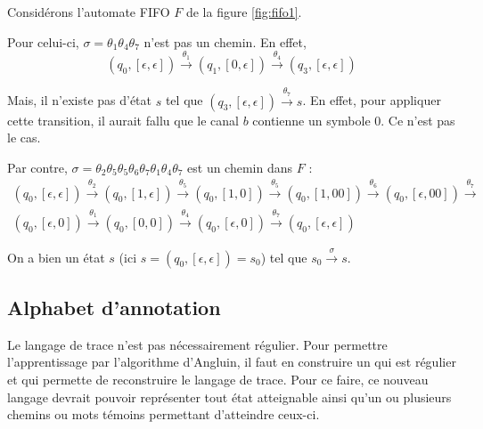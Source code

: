 \begin{example}
  Considérons l'automate FIFO $F$ de la figure \ref{fig:fifo1}.

  Pour celui-ci, $\sigma=\theta_1\theta_4\theta_7$ n'est pas un chemin. En effet,
  $$
  (q_0,[\epsilon,\epsilon])\xrightarrow{\theta_1}(q_1,[0,\epsilon])\xrightarrow{\theta_4}(q_3,[\epsilon,\epsilon])
  $$

  Mais, il n'existe pas d'état $s$ tel que $(q_3,[\epsilon,\epsilon])\xrightarrow{\theta_7}s$. En effet, pour appliquer cette transition, il aurait fallu que le canal $b$ contienne un symbole $0$. Ce n'est pas le cas.


  Par contre, $\sigma=\theta_2\theta_5\theta_5\theta_6\theta_7\theta_1\theta_4\theta_7$ est un chemin dans $F$ :
  \begin{equation*}
    \begin{gathered}
      (q_0,[\epsilon,\epsilon])\xrightarrow{\theta_2}
      (q_0,[1,\epsilon])\xrightarrow{\theta_5}
      (q_0,[1,0])\xrightarrow{\theta_5}
      (q_0,[1,00])\xrightarrow{\theta_6}
      (q_0,[\epsilon,00])\xrightarrow{\theta_7}\\
      (q_0,[\epsilon,0])\xrightarrow{\theta_1}
      (q_0,[0,0])\xrightarrow{\theta_4}
      (q_0,[\epsilon,0])\xrightarrow{\theta_7}
      (q_0,[\epsilon,\epsilon])
    \end{gathered}
  \end{equation*}

  On a bien un état $s$ (ici $s=(q_0,[\epsilon,\epsilon])=s_0$) tel que $s_0\xrightarrow{\sigma}s$.

\end{example}




\subsection{Alphabet d'annotation}

Le langage de trace n'est pas nécessairement régulier. Pour permettre l'apprentissage par l'algorithme d'Angluin, il faut en construire un qui est régulier et qui permette de reconstruire le langage de trace. Pour ce faire, ce nouveau langage devrait pouvoir représenter tout état atteignable ainsi qu'un ou plusieurs chemins ou mots témoins permettant d'atteindre ceux-ci.

